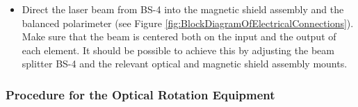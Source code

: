 \documentclass{../lab}
\begin{document}
\begin{itemize}
    \item Direct the laser beam from BS-4 into the magnetic shield assembly and the balanced polarimeter (see Figure \ref{fig:BlockDiagramOfElectricalConnections}). Make sure that the beam is centered both on the input and the output of each element. It should be possible to achieve this by adjusting the beam splitter BS-4 and the relevant optical and magnetic shield assembly mounts.

\end{itemize}

\subsubsection{Procedure for the Optical Rotation Equipment}
\end{document}
